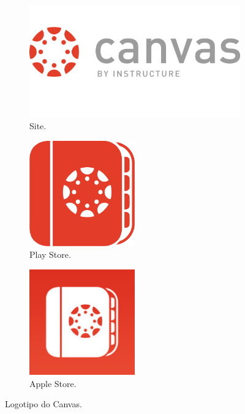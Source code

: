 \documentclass[12pt,a4paper,oneside]{article}
\begin{document}
\begin{figure}[htb]
	\centering
	\begin{subfigure}[b]{0.3\textwidth}
		\centering
		\includegraphics[width=\textwidth]{imagens/canvas.png}
		\caption{Site.}
		\label{canvasLogo}
	\end{subfigure}
	\begin{subfigure}[b]{0.3\textwidth}
		\centering
		\includegraphics[width=0.5\textwidth]{imagens/canvasApp.png}
		\caption{{\sf Play Store}.}
		\label{canvasApp}
	\end{subfigure}
	\begin{subfigure}[b]{0.3\textwidth}
		\centering
		\includegraphics[width=0.5\textwidth]{imagens/canvasIPhone.jpg}
		\caption{{\sf Apple Store}.}
		\label{canvasApple}
	\end{subfigure}
	\caption{Logotipo do {\sf Canvas}.}
	\label{canvas}
\end{figure}
\end{document}
